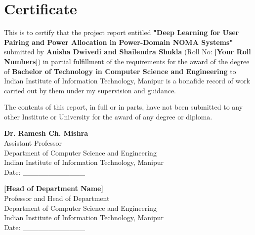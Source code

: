 \chapter*{Certificate}

\vspace{1cm}

This is to certify that the project report entitled \textbf{"Deep Learning for User Pairing and Power Allocation in Power-Domain NOMA Systems"} submitted by \textbf{Anisha Dwivedi and Shailendra Shukla} (Roll No: \textbf{[Your Roll Numbers]}) in partial fulfillment of the requirements for the award of the degree of \textbf{Bachelor of Technology in Computer Science and Engineering} to Indian Institute of Information Technology, Manipur is a bonafide record of work carried out by them under my supervision and guidance.

\vspace{1cm}

The contents of this report, in full or in parts, have not been submitted to any other Institute or University for the award of any degree or diploma.

\vspace{3cm}

\begin{flushleft}
\textbf{Dr. Ramesh Ch. Mishra} \\
{Assistant Professor} \\
Department of Computer Science and Engineering \\
Indian Institute of Information Technology, Manipur \\
Date: \_\_\_\_\_\_\_\_\_\_\_\_
\end{flushleft}

\vspace{2cm}

\begin{flushleft}
\textbf{[Head of Department Name]} \\
Professor and Head of Department \\
Department of Computer Science and Engineering \\
Indian Institute of Information Technology, Manipur \\
Date: \_\_\_\_\_\_\_\_\_\_\_\_
\end{flushleft}

\newpage
